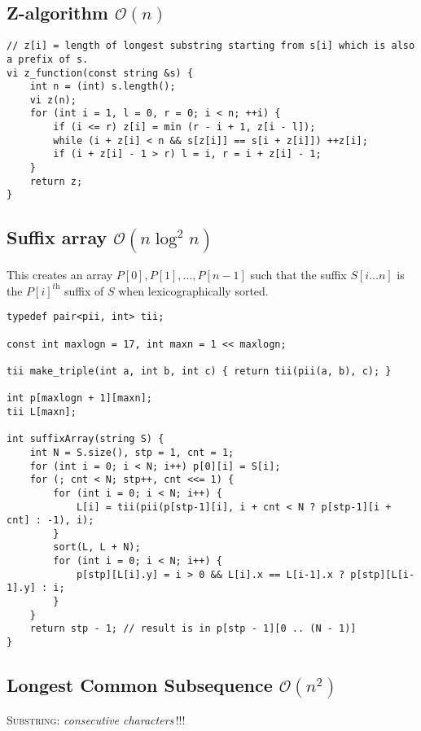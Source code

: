 \documentclass{article}
\begin{document}
\subsection{Z-algorithm $\mathcal{O}(n)$}

\begin{lstlisting}
// z[i] = length of longest substring starting from s[i] which is also a prefix of s.
vi z_function(const string &s) {
	int n = (int) s.length();
	vi z(n);
	for (int i = 1, l = 0, r = 0; i < n; ++i) {
		if (i <= r) z[i] = min (r - i + 1, z[i - l]);
		while (i + z[i] < n && s[z[i]] == s[i + z[i]]) ++z[i];
		if (i + z[i] - 1 > r) l = i, r = i + z[i] - 1;
	}
	return z;
}
\end{lstlisting}

\subsection{Suffix array $\mathcal{O}(n \log^2{n})$}

This creates an array $P[0], P[1], \dots, P[n-1]$ such that the suffix $S[i \dots n]$ is the $P[i]^\textit{th}$ suffix of $S$ when lexicographically sorted.

\begin{lstlisting}
typedef pair<pii, int> tii;

const int maxlogn = 17, int maxn = 1 << maxlogn;

tii make_triple(int a, int b, int c) { return tii(pii(a, b), c); }

int p[maxlogn + 1][maxn];
tii L[maxn];

int suffixArray(string S) {
	int N = S.size(), stp = 1, cnt = 1;
	for (int i = 0; i < N; i++) p[0][i] = S[i];
	for (; cnt < N; stp++, cnt <<= 1) {
		for (int i = 0; i < N; i++) {
			L[i] = tii(pii(p[stp-1][i], i + cnt < N ? p[stp-1][i + cnt] : -1), i);
		}
		sort(L, L + N);
		for (int i = 0; i < N; i++) {
			p[stp][L[i].y] = i > 0 && L[i].x == L[i-1].x ? p[stp][L[i-1].y] : i;
		}
	}
	return stp - 1; // result is in p[stp - 1][0 .. (N - 1)]
}
\end{lstlisting}

\subsection{Longest Common Subsequence $\mathcal{O}(n^{2})$}
\textsc{Substring}: \textit{consecutive characters}\,!!!
\end{document}
